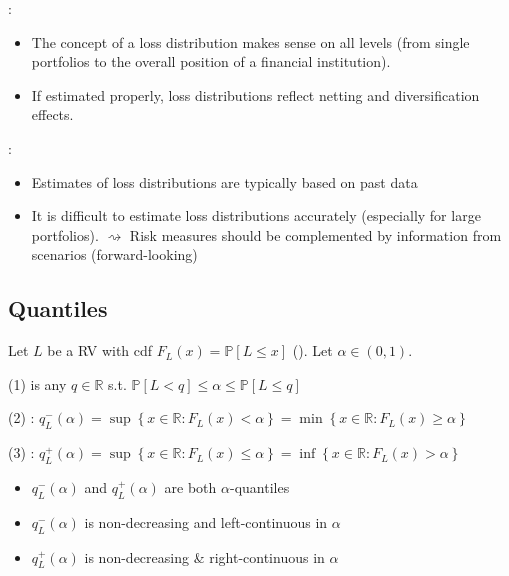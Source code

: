 : 
\begin{itemize}[leftmargin=*]
    \item The concept of a loss distribution makes sense on all levels (from single portfolios to the overall position of a financial institution).
    \item If estimated properly, loss distributions reflect netting and diversification effects.
\end{itemize}

:
\begin{itemize}[leftmargin=*]
    \item Estimates of loss distributions are typically based on past data
    \item It is difficult to estimate loss distributions accurately (especially for large portfolios). $\rightsquigarrow$ Risk measures should be complemented by information from scenarios (forward-looking)
\end{itemize}














\subsection*{Quantiles}
Let $L$ be a RV with cdf $F_{L}(x)=\mathbb{P}[L \leq x]$ (). Let $\alpha \in(0,1)$.

(1)  is any $q \in \mathbb{R}$ s.t. $\mathbb{P}[L<q] \leq \alpha \leq \mathbb{P}[L \leq q]$

(2) : $q_{L}^{-}(\alpha)=\sup \left\{x \in \mathbb{R}: F_{L}(x)<\alpha\right\}=\min \left\{x \in \mathbb{R}: F_{L}(x) \geq \alpha\right\}$

(3) : $q_{L}^{+}(\alpha)=\sup \left\{x \in \mathbb{R}: F_{L}(x) \leq \alpha\right\}=\inf \left\{x \in \mathbb{R}: F_{L}(x)>\alpha\right\}$

\begin{itemize}[leftmargin=*]
    \item $q_{L}^{-}(\alpha)$ and $q_{L}^{+}(\alpha)$ are both $\alpha$-quantiles
    \item $q_{L}^{-}(\alpha)$ is non-decreasing and left-continuous in $\alpha$
    \item $q_{L}^{+}(\alpha)$ is non-decreasing \& right-continuous in $\alpha$
\end{itemize}

